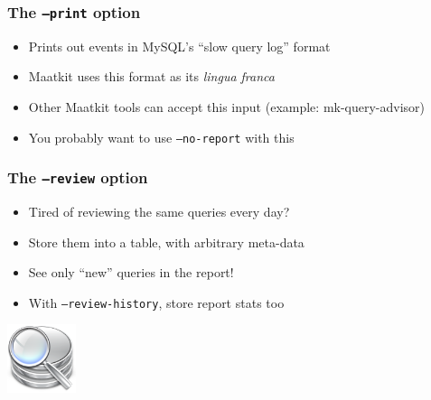 \begin{frame}
   \frametitle{The \texttt{--print} option}
   \begin{itemize}
      \item Prints out events in MySQL's ``slow query log'' format
      \item Maatkit uses this format as its \emph{lingua franca}
      \item Other Maatkit tools can accept this input (example: mk-query-advisor)
      \item You probably want to use \texttt{--no-report} with this
   \end{itemize}
\end{frame}

\begin{frame}
   \frametitle{The \texttt{--review} option}
   \begin{itemize}
      \item Tired of reviewing the same queries every day?
      \item Store them into a table, with arbitrary meta-data
      \item See only ``new'' queries in the report!
      \item With \texttt{--review-history}, store report stats too
   \end{itemize}
   \includegraphics[width=20mm]{../image/database_search}
\end{frame}
